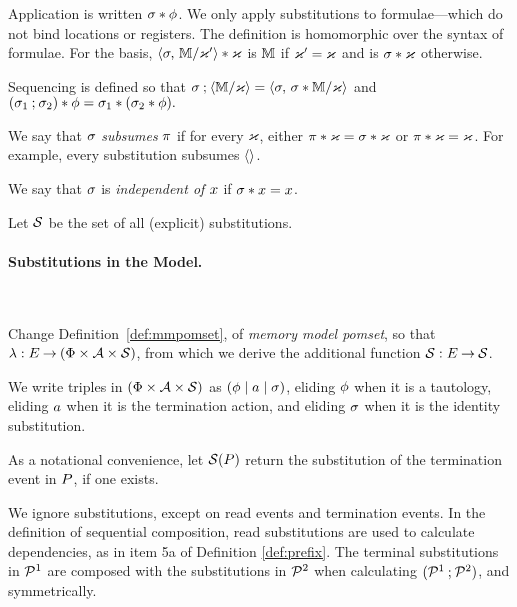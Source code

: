 Application is written $\sigma\mathbin{\ast}\phi$.  We only apply substitutions to
formulae---which do not bind locations or registers.  The definition is
homomorphic over the syntax of formulae. For the basis, 
\begin{math}
  \langle\sigma,\,\mathbb{M}/\varkappa'\rangle\mathbin{\ast}\varkappa
\end{math}
is $\mathbb{M}$ if $\varkappa'=\varkappa$ and is $\sigma \mathbin{\ast}\varkappa$ otherwise.

Sequencing is defined so that
\begin{math}
  \sigma\mathbin{;}\langle\mathbb{M}/\varkappa\rangle
  \allowbreak= 
  \langle\sigma,\,\sigma\mathbin{\ast}\mathbb{M}/\varkappa\rangle
\end{math}
and
\begin{math}
  (\sigma_1\mathbin{;}\sigma_2)\mathbin{\ast}\phi = \sigma_1\mathbin{\ast}(\sigma_2\mathbin{\ast}\phi).
\end{math}

We say that $\sigma$ \emph{subsumes} $\pi$ if for every $\varkappa$, either
$\pi\mathbin{\ast}\varkappa=\sigma\mathbin{\ast}\varkappa$ or $\pi\mathbin{\ast}\varkappa=\varkappa$.
For example, every substitution subsumes $\langle\rangle$.

We say that $\sigma$ is \emph{independent of $x$} if $\sigma\mathbin{\ast}x=x$.

Let $\mathcal{S}$ be the set of all (explicit) substitutions.

\paragraph{Substitutions in the Model.}\

Change Definition~\ref{def:mmpomset}, of \emph{memory model pomset}, so that
$\lambda: E \mathbin\rightarrow (\Phi\times\mathcal{A}\times\mathcal{S})$, from which we
derive the additional function $\mathcal{S}:E\mathbin\rightarrow\mathcal{S}$.

We write triples in $(\Phi\times\mathcal{A}\times\mathcal{S})$ as
$(\phi \mid a\mid \sigma)$, eliding $\phi$ when it is a tautology,
eliding $a$ when it is the termination action, and eliding $\sigma$ when
it is the identity substitution.

As a notational convenience, let $\mathcal{S}(P)$ return the substitution
of the termination event in $P$, if one exists.  

We ignore substitutions, except on read events and termination events.  In
the definition of sequential composition, read substitutions are used to
calculate dependencies, as in item 5a of Definition \ref{def:prefix}.  The
terminal substitutions in $\mathcal{P}^1$ are composed with the substitutions in
$\mathcal{P}^2$ when calculating $(\mathcal{P}^1\mathbin;\mathcal{P}^2)$, and symmetrically.


